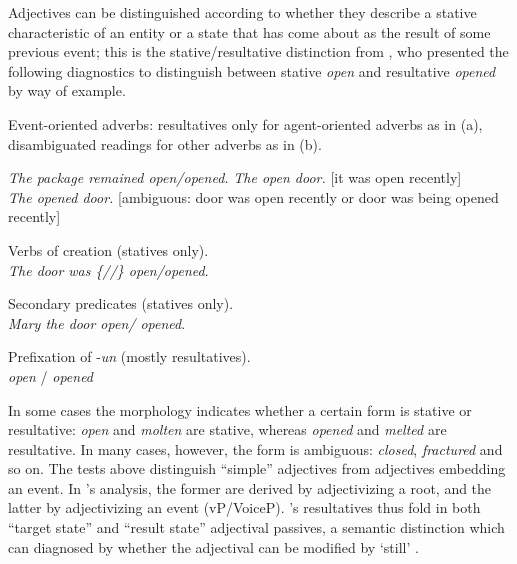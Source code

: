 \begin{exe}
\begin{xlist}
\begin{exe}
\begin{xlist}
\begin{exe}
\begin{exe}
\begin{xlist}
\begin{exe}
\begin{exe}
\begin{xlist}
\begin{exe}
\begin{xlist}
\begin{exe}
\begin{xlist}
\begin{exe}
\begin{xlist}
\begin{exe}
\begin{xlist}
\begin{xlist}
Adjectives can be distinguished according to whether they describe a stative characteristic of an entity or a state that has come about as the result of some previous event; this is the stative/resultative distinction from \cite{embick04li}, who presented the following diagnostics to distinguish between stative \emph{open} and resultative \emph{opened} by way of example.
 \begin{exe}
 \ex  Event-oriented adverbs: resultatives only for agent-oriented adverbs as in (a), disambiguated readings for other adverbs as in (b). 
	 \begin{xlist} 
 	\ex  \emph{The package remained  \xmark open/\cmark opened.} 
 	\ex  \emph{The  open door.} [it was open recently] \\
		\emph{The  opened door.} [ambiguous: door was open recently or door was being opened recently]
	 \z

\ex  Verbs of creation (statives only). \\
	\emph{The door was \{//\} \cmark open/\xmark opened}.

\ex  Secondary predicates (statives only). \\
	\emph{Mary  the door \cmark open/ \xmark opened}.

\ex  Prefixation of -\emph{un} (mostly resultatives). \\
	\xmark \emph{open} / \cmark \emph{opened}
 \z 

In some cases the morphology indicates whether a certain form is stative or resultative: \emph{open} and \emph{molten} are stative, whereas \emph{opened} and \emph{melted} are resultative. In many cases, however, the form is ambiguous: \emph{closed}, \emph{fractured} and so on. The tests above distinguish ``simple'' adjectives from adjectives embedding an event. In \citeauthor{embick04li}'s analysis, the former are derived by adjectivizing a root, and the latter by adjectivizing an event (vP/VoiceP). \citeauthor{embick04li}'s resultatives thus fold in both ``target state'' and ``result state'' adjectival passives, a semantic distinction which can diagnosed by whether the adjectival  can be modified by `still' \citep{kratzer00bls,alexiadouetal14}.


\end{xlist}
\end{exe}
\end{xlist}
\end{xlist}
\end{exe}
\end{xlist}
\end{exe}
\end{xlist}
\end{exe}
\end{xlist}
\end{exe}
\end{xlist}
\end{exe}
\end{exe}
\end{xlist}
\end{exe}
\end{exe}
\end{xlist}
\end{exe}
\end{xlist}
\end{exe}
